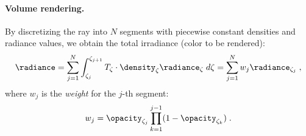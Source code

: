 \paragraph{Volume rendering.}
By discretizing the ray into $N$ segments with piecewise constant densities and radiance values, we obtain the total irradiance (color to be rendered): %
\begin{equation}
    \begin{aligned}
      \radiance = \sum_{j=1}^N \int_{\zeta_j}^{\zeta_{j+1}}  T_{\zeta} \cdot \density_\zeta \radiance_\zeta \;d\zeta  
      = \sum_{j=1}^N  w_j \radiance_{\zeta_j}\;,
    \end{aligned}
    \label{eq: vol_render_nerf}
\end{equation}
where $w_j$ is the \textit{weight} for the $j$-th segment:
\begin{equation}
    \label{eq:weights_nerf}
    w_j = \opacity_{\zeta_j}\prod_{k=1}^{j-1}(1 - \opacity_{\zeta_k})\;.
\end{equation}
